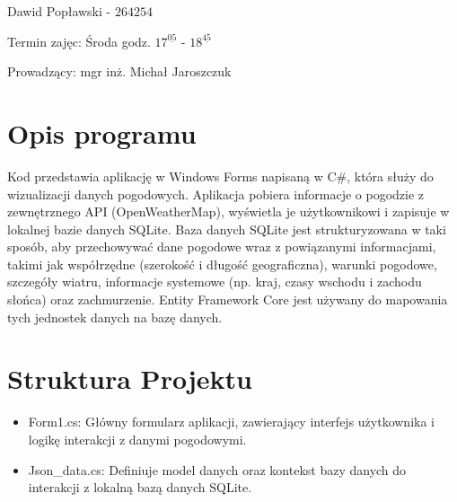 \documentclass{report}
\begin{document}
\begin{titlepage}
\begin{center}
{			}
		\end{center}
		
		\vspace*{2cm}
		
		\begin{flushright}
			{
				Dawid Popławski - $264254$
				
				Termin zajęc: Środa godz. $17^{\underline{05}}$ - $18^{\underline{45}}$ 
				
				Prowadzący: mgr inż. Michał Jaroszczuk
				
			}
			
		\end{flushright}
		
		\vfill
		
\end{titlepage}

\tableofcontents

\chapter{Opis programu}

Kod przedstawia aplikację w Windows Forms napisaną w C\#, która służy do wizualizacji danych pogodowych. Aplikacja pobiera informacje o pogodzie z zewnętrznego API (OpenWeatherMap), wyświetla je użytkownikowi i zapisuje w lokalnej bazie danych SQLite. Baza danych SQLite jest strukturyzowana w taki sposób, aby przechowywać dane pogodowe wraz z powiązanymi informacjami, takimi jak współrzędne (szerokość i długość geograficzna), warunki pogodowe, szczegóły wiatru, informacje systemowe (np. kraj, czasy wschodu i zachodu słońca) oraz zachmurzenie. Entity Framework Core jest używany do mapowania tych jednostek danych na bazę danych.

\vspace*{15pt}

{\let\clearpage\relax\chapter{Struktura Projektu}}

\begin{itemize}
	\item Form1.cs: Główny formularz aplikacji, zawierający interfejs użytkownika i logikę interakcji z danymi pogodowymi.
	
	\item Json\_data.cs: Definiuje model danych oraz kontekst bazy danych do interakcji z lokalną bazą danych SQLite.
\end{itemize}
\end{document}

